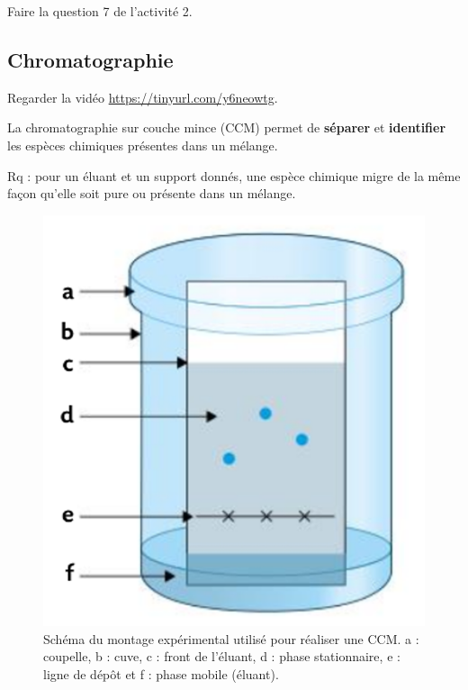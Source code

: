 \documentclass[12pt,a4paper]{article}
\begin{document}
\begin{conseil}
Faire la question 7 de l'activité 2.
\end{conseil}

\subsection{Chromatographie}

\begin{conseil}
Regarder la vidéo \href{https://tinyurl.com/y6neowtg}{https://tinyurl.com/y6neowtg}.
\end{conseil}

\begin{definition}
La chromatographie sur couche mince (CCM) permet de \textbf{séparer} et \textbf{identifier} les espèces chimiques présentes dans un mélange.
\end{definition}
Rq : pour un éluant et un support donnés, une espèce chimique migre de la même façon qu'elle soit pure ou présente dans un mélange.

\begin{figure}[h]
\center
\includegraphics[scale=0.5]{../images/ccm_schema.png}
\caption{Schéma du montage expérimental utilisé pour réaliser une CCM.
a : coupelle, b : cuve, c : front de l'éluant, d : phase stationnaire, e : ligne de dépôt et f : phase mobile (éluant).}
\end{figure}
\end{document}
